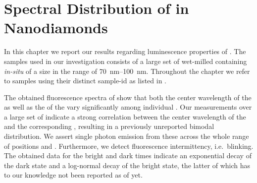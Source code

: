 
\chapter[Spectral Distribution]{Spectral Distribution of \sivs in Nanodiamonds}	\label{ch::distribution}

	In this chapter we report our results regarding luminescence properties of \sivs. The samples used in our investigation consists of a large set of wet-milled \CVD \nds containing \textit{in-situ} \sivs of a size in the range of \SIrange{70}{100}{\nm}. Throughout the chapter we refer to samples using their distinct sample-id as listed in .

	The obtained fluorescence spectra of \sivs show that both the center wavelength of the \ZPL as well as the \lw of the \zpl vary significantly among individual \nds.
	Our measurements over a large set of \sivs indicate a strong correlation between the center wavelength of the \zpl and the corresponding \lws, resulting in a previously unreported bimodal distribution.
	We assert single photon emission from these \sivs across the whole range of \zpl positions and \lws.
	Furthermore, we detect fluorescence intermittency, i.e.\ blinking. The obtained data for the bright and dark times indicate
	an exponential decay of the dark state and a log-normal decay of the bright state, the latter of which has to our knowledge not been reported as of yet.
